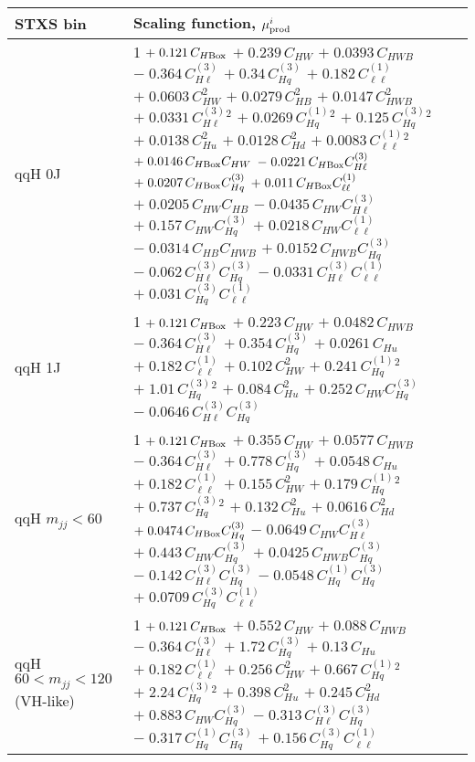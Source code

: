 \begin{tabular}{l|p{}}
    \hline
    STXS bin & Scaling function, $\mu^i_{\rm{prod}}$ \\ \hline
    qqH 0J & 1 $+\;0.121\,C_{H\rm{Box}}$ $+\;0.239\,C_{HW}$ $+\;0.0393\,C_{HWB}$ $-\;0.364\,C^{(3)}_{H\ell}$ $+\;0.34\,C^{(3)}_{Hq}$ $+\;0.182\,C^{(1)}_{\ell\ell}$ $+\;0.0603\,C_{HW}^{2}$ $+\;0.0279\,C_{HB}^{2}$ $+\;0.0147\,C_{HWB}^{2}$ $+\;0.0331\,C^{(3)}_{H\ell}^{2}$ $+\;0.0269\,C^{(1)}_{Hq}^{2}$ $+\;0.125\,C^{(3)}_{Hq}^{2}$ $+\;0.0138\,C_{Hu}^{2}$ $+\;0.0128\,C_{Hd}^{2}$ $+\;0.0083\,C^{(1)}_{\ell\ell}^{2}$ $+\;0.0146\,C_{H\rm{Box}}C_{HW}$ $-\;0.0221\,C_{H\rm{Box}}C^{(3)}_{H\ell}$ $+\;0.0207\,C_{H\rm{Box}}C^{(3)}_{Hq}$ $+\;0.011\,C_{H\rm{Box}}C^{(1)}_{\ell\ell}$ $+\;0.0205\,C_{HW}C_{HB}$ $-\;0.0435\,C_{HW}C^{(3)}_{H\ell}$ $+\;0.157\,C_{HW}C^{(3)}_{Hq}$ $+\;0.0218\,C_{HW}C^{(1)}_{\ell\ell}$ $-\;0.0314\,C_{HB}C_{HWB}$ $+\;0.0152\,C_{HWB}C^{(3)}_{Hq}$ $-\;0.062\,C^{(3)}_{H\ell}C^{(3)}_{Hq}$ $-\;0.0331\,C^{(3)}_{H\ell}C^{(1)}_{\ell\ell}$ $+\;0.031\,C^{(3)}_{Hq}C^{(1)}_{\ell\ell}$ \\
    qqH 1J & 1 $+\;0.121\,C_{H\rm{Box}}$ $+\;0.223\,C_{HW}$ $+\;0.0482\,C_{HWB}$ $-\;0.364\,C^{(3)}_{H\ell}$ $+\;0.354\,C^{(3)}_{Hq}$ $+\;0.0261\,C_{Hu}$ $+\;0.182\,C^{(1)}_{\ell\ell}$ $+\;0.102\,C_{HW}^{2}$ $+\;0.241\,C^{(1)}_{Hq}^{2}$ $+\;1.01\,C^{(3)}_{Hq}^{2}$ $+\;0.084\,C_{Hu}^{2}$ $+\;0.252\,C_{HW}C^{(3)}_{Hq}$ $-\;0.0646\,C^{(3)}_{H\ell}C^{(3)}_{Hq}$ \\
    qqH $m_{jj} < 60$ & 1 $+\;0.121\,C_{H\rm{Box}}$ $+\;0.355\,C_{HW}$ $+\;0.0577\,C_{HWB}$ $-\;0.364\,C^{(3)}_{H\ell}$ $+\;0.778\,C^{(3)}_{Hq}$ $+\;0.0548\,C_{Hu}$ $+\;0.182\,C^{(1)}_{\ell\ell}$ $+\;0.155\,C_{HW}^{2}$ $+\;0.179\,C^{(1)}_{Hq}^{2}$ $+\;0.737\,C^{(3)}_{Hq}^{2}$ $+\;0.132\,C_{Hu}^{2}$ $+\;0.0616\,C_{Hd}^{2}$ $+\;0.0474\,C_{H\rm{Box}}C^{(3)}_{Hq}$ $-\;0.0649\,C_{HW}C^{(3)}_{H\ell}$ $+\;0.443\,C_{HW}C^{(3)}_{Hq}$ $+\;0.0425\,C_{HWB}C^{(3)}_{Hq}$ $-\;0.142\,C^{(3)}_{H\ell}C^{(3)}_{Hq}$ $-\;0.0548\,C^{(1)}_{Hq}C^{(3)}_{Hq}$ $+\;0.0709\,C^{(3)}_{Hq}C^{(1)}_{\ell\ell}$ \\
    qqH $60 < m_{jj} < 120$ (VH-like) & 1 $+\;0.121\,C_{H\rm{Box}}$ $+\;0.552\,C_{HW}$ $+\;0.088\,C_{HWB}$ $-\;0.364\,C^{(3)}_{H\ell}$ $+\;1.72\,C^{(3)}_{Hq}$ $+\;0.13\,C_{Hu}$ $+\;0.182\,C^{(1)}_{\ell\ell}$ $+\;0.256\,C_{HW}^{2}$ $+\;0.667\,C^{(1)}_{Hq}^{2}$ $+\;2.24\,C^{(3)}_{Hq}^{2}$ $+\;0.398\,C_{Hu}^{2}$ $+\;0.245\,C_{Hd}^{2}$ $+\;0.883\,C_{HW}C^{(3)}_{Hq}$ $-\;0.313\,C^{(3)}_{H\ell}C^{(3)}_{Hq}$ $-\;0.317\,C^{(1)}_{Hq}C^{(3)}_{Hq}$ $+\;0.156\,C^{(3)}_{Hq}C^{(1)}_{\ell\ell}$ \\

\end{tabular}
